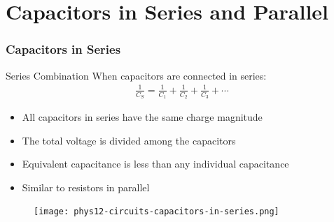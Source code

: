 \documentclass{beamer}
\begin{document}
\section{Capacitors in Series and Parallel}

\begin{frame}
    \frametitle{Capacitors in Series}
    
    \begin{block}{Series Combination}
        When capacitors are connected in series:
        \begin{align}
            \frac{1}{C_S} = \frac{1}{C_1} + \frac{1}{C_2} + \frac{1}{C_3} + \cdots
        \end{align}
    \end{block}
    
    \begin{itemize}
        \item All capacitors in series have the same charge magnitude
        \item The total voltage is divided among the capacitors
        \item Equivalent capacitance is less than any individual capacitance
        \item Similar to resistors in parallel
    \end{itemize}
    
    \begin{center}
        \begin{figure}
            \centering
            \texttt{[image: phys12-circuits-capacitors-in-series.png]}
        \end{figure}
    \end{center}
\end{frame}
\end{document}
